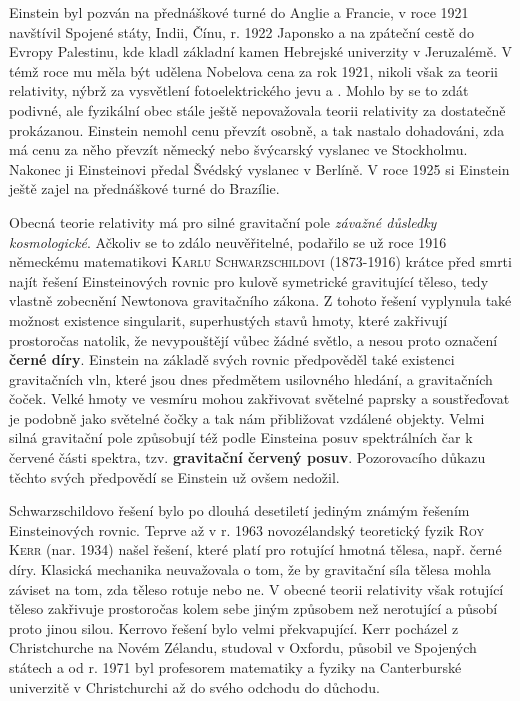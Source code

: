         Einstein byl pozván na přednáškové turné do Anglie a Francie, v roce 1921 navštívil Spojené
        státy, Indii, Čínu, r. 1922 Japonsko a na zpáteční cestě do Evropy Palestinu, kde kladl
        základní kamen Hebrejské univerzity v Jeruzalémě. V témž roce mu měla být udělena Nobelova
        cena za rok 1921, nikoli však za teorii relativity, nýbrž za vysvětlení fotoelektrického
        jevu a \emph{}. Mohlo by se to zdát podivné, ale
        fyzikální obec stále ještě nepovažovala teorii relativity za dostatečně prokázanou. Einstein
        nemohl cenu převzít osobně, a tak nastalo dohadováni, zda má cenu za něho převzít německý
        nebo švýcarský vyslanec ve Stockholmu. Nakonec ji Einsteinovi předal Švédský vyslanec v
        Berlíně. V roce 1925 si Einstein ještě zajel na přednáškové turné do Brazílie.

        Obecná teorie relativity má pro silné gravitační pole \emph{závažné důsledky kosmologické}.
        Ačkoliv se to zdálo neuvěřitelné, podařilo se už roce 1916 německému matematikovi
        \textsc{Karlu Schwarzschildovi} (1873-1916) krátce před smrti najít řešení Einsteinových
        rovnic pro kulově symetrické gravitující těleso, tedy vlastně zobecnění Newtonova
        gravitačního zákona. Z tohoto řešení vyplynula také možnost existence singularit,
        superhustých stavů hmoty, které zakřivují prostoročas natolik, že nevypouštějí vůbec žádné
        světlo, a nesou proto označení \textbf{černé díry}. Einstein na základě svých rovnic
        předpověděl také existenci gravitačních vln, které jsou dnes předmětem usilovného hledání, a
        gravitačních čoček. Velké hmoty ve vesmíru mohou zakřivovat světelné paprsky a soustřeďovat
        je podobně jako světelné čočky a tak nám přibližovat vzdálené objekty. Velmi silná
        gravitační pole způsobují též podle Einsteina posuv spektrálních čar k červené části
        spektra, tzv. \textbf{gravitační červený posuv}. Pozorovacího důkazu těchto svých předpovědí
        se Einstein už ovšem nedožil.

        \begin{tcnote}
          Schwarzschildovo řešení bylo po dlouhá desetiletí jediným známým řešením Einsteinových
          rovnic. Teprve až v r. 1963 novozélandský teoretický fyzik \textsc{Roy Kerr} (nar. 1934)
          našel řešení, které platí pro rotující hmotná tělesa, např. černé díry. Klasická mechanika
          neuvažovala o tom, že by gravitační síla tělesa mohla záviset na tom, zda těleso rotuje
          nebo ne. V obecné teorii relativity však rotující těleso zakřivuje prostoročas kolem sebe
          jiným způsobem než nerotující a působí proto jinou silou. Kerrovo řešení bylo velmi
          překvapující. Kerr pocházel z Christchurche na Novém Zélandu, studoval v Oxfordu, působil
          ve Spojených státech a od r. 1971 byl profesorem matematiky a fyziky na Canterburské
          univerzitě v Christchurchi až do svého odchodu do důchodu.
        \end{tcnote}

